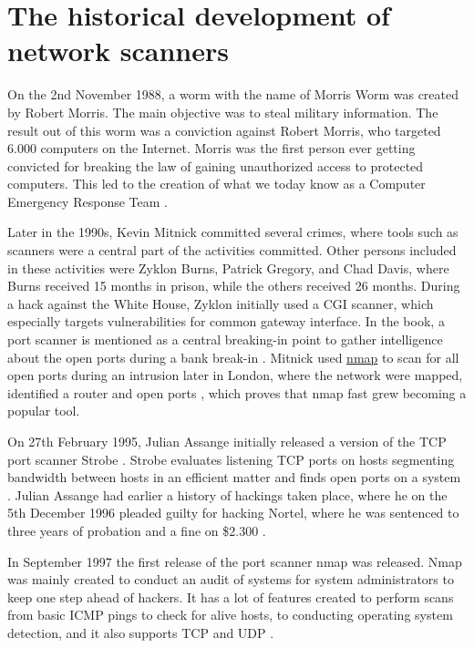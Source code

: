 \section{The historical development of network scanners}
\label{s:HistoryScanning}

On the 2nd November 1988, a worm with the name of Morris Worm was created by Robert Morris. The main objective was to steal military information. The result out of this worm was a conviction against Robert Morris, who targeted 6.000 computers on the Internet. Morris was the first person ever getting convicted for breaking the law of gaining unauthorized access to protected computers. This led to the creation of what we today know as a Computer Emergency Response Team \autocite{DayaBhavya,FBIMorris}.

Later in the 1990s, Kevin Mitnick committed several crimes, where tools such as scanners were a central part of the activities committed. Other persons included in these activities were Zyklon Burns, Patrick Gregory, and Chad Davis, where Burns received 15 months in prison, while the others received 26 months. During a hack against the White House, Zyklon initially used a CGI scanner, which especially targets vulnerabilities for common gateway interface. In the book, a port scanner is mentioned as a central breaking-in point to gather intelligence about the open ports during a bank break-in \autocite{MitnickArtIntrusion}. Mitnick used \hyperref[s:HowNmapWorks]{nmap} to scan for all open ports during an intrusion later in London, where the network were mapped, identified a router and open ports \autocite{MitnickArtIntrusion}, which proves that nmap fast grew becoming a popular tool.

On 27th February 1995, Julian Assange initially released a version of the TCP port scanner Strobe \autocite{StrobeAssange}. Strobe evaluates listening TCP ports on hosts segmenting bandwidth between hosts in an efficient matter \autocite{StrobeMan} and finds open ports on a system \autocite{JulianAssangeBook,BLYTH199943}.
Julian Assange had earlier a history of hackings taken place, where he on the 5th December 1996 pleaded guilty for hacking Nortel, where he was sentenced to three years of probation and a fine on \$2.300 \autocite{JulianAssangeBook}.

In September 1997 the first release of the port scanner nmap was released. Nmap was mainly created to conduct an audit of systems for system administrators to keep one step ahead of hackers. It has a lot of features created to perform scans from basic ICMP pings to check for alive hosts, to conducting operating system detection, and it also supports TCP and UDP \autocite{pinkard2008nmap}.

